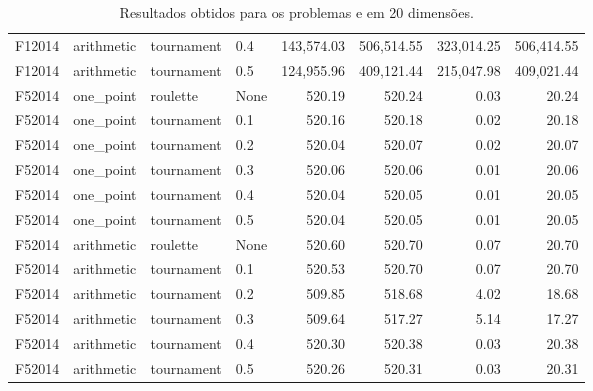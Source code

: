 \begin{table}[!ht]
{\begin{tabular}{llllrrrr}
            F12014                                     & arithmetic & tournament & 0.4  & 143,574.03     & 506,514.55     & 323,014.25    & 506,414.55     \\
            F12014                                     & arithmetic & tournament & 0.5  & 124,955.96     & 409,121.44     & 215,047.98    & 409,021.44     \\
            F52014                                     & one\_point & roulette   & None & 520.19         & 520.24         & 0.03          & 20.24          \\
            F52014                                     & one\_point & tournament & 0.1  & 520.16         & 520.18         & 0.02          & 20.18          \\
            F52014                                     & one\_point & tournament & 0.2  & 520.04         & 520.07         & 0.02          & 20.07          \\
            F52014                                     & one\_point & tournament & 0.3  & 520.06         & 520.06         & 0.01          & 20.06          \\
            F52014                                     & one\_point & tournament & 0.4  & 520.04         & 520.05         & 0.01          & 20.05          \\
            F52014                                     & one\_point & tournament & 0.5  & 520.04         & 520.05         & 0.01          & 20.05          \\
            F52014                                     & arithmetic & roulette   & None & 520.60         & 520.70         & 0.07          & 20.70          \\
            F52014                                     & arithmetic & tournament & 0.1  & 520.53         & 520.70         & 0.07          & 20.70          \\
            F52014                                     & arithmetic & tournament & 0.2  & 509.85         & 518.68         & 4.02          & 18.68          \\
            F52014                                     & arithmetic & tournament & 0.3  & 509.64         & 517.27         & 5.14          & 17.27          \\
            F52014                                     & arithmetic & tournament & 0.4  & 520.30         & 520.38         & 0.03          & 20.38          \\
            F52014                                     & arithmetic & tournament & 0.5  & 520.26         & 520.31         & 0.03          & 20.31          \\
            \toprule
        \end{tabular}%
    }
    \caption{Resultados obtidos para os problemas  e  em 20 dimensões.
    }%
    \label{tab:fitness_20}
\end{table}

